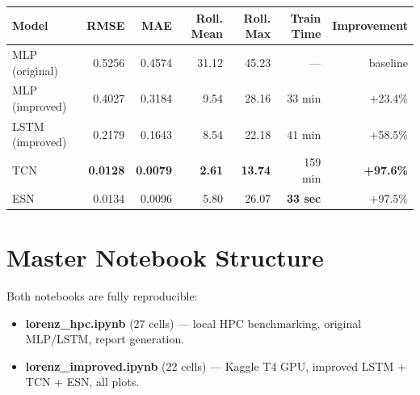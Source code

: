 \documentclass[11pt,a4paper]{article}
\newcommand{\good}[1]{{\color{OliveGreen}\textbf{#1}}}
\begin{document}
\begin{center}
\begin{tabular}{lrrrrrr}
  \toprule
  \rowcolor{accent!15}
  \textbf{Model} & \textbf{RMSE} & \textbf{MAE} &
  \textbf{Roll. Mean} & \textbf{Roll. Max} &
  \textbf{Train Time} & \textbf{Improvement} \\
  \midrule
  MLP (original) & 0.5256 & 0.4574 & 31.12 & 45.23 & --- & baseline \\
  MLP (improved) & 0.4027 & 0.3184 & 9.54  & 28.16 & 33 min  & +23.4\% \\
  LSTM (improved)& 0.2179 & 0.1643 & 8.54  & 22.18 & 41 min  & +58.5\% \\
  TCN            & \good{0.0128} & \good{0.0079} & \good{2.61} & \good{13.74} & 159 min & \good{+97.6\%} \\
  ESN            & 0.0134 & 0.0096 & 5.80  & 26.07 & \good{33 sec} & +97.5\% \\
  \bottomrule
\end{tabular}
\end{center}

\section{Master Notebook Structure}

Both notebooks are fully reproducible:
\begin{itemize}
  \item \textbf{lorenz\_hpc.ipynb} (27 cells) --- local HPC benchmarking,
        original MLP/LSTM, report generation.
  \item \textbf{lorenz\_improved.ipynb} (22 cells) --- Kaggle T4 GPU,
        improved LSTM + TCN + ESN, all plots.
\end{itemize}
\end{document}
